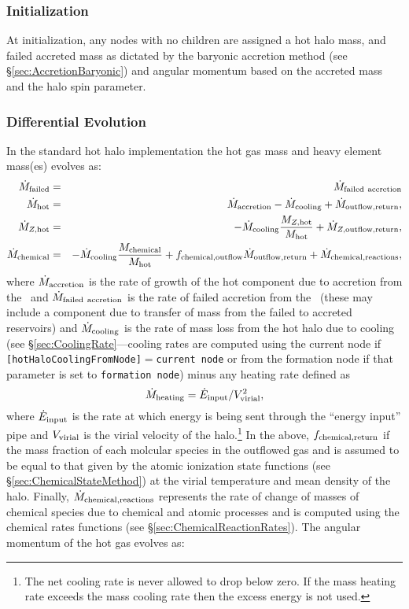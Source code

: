 \subsubsection{Initialization}

At initialization, any nodes with no children are assigned a hot halo mass, and failed accreted mass as dictated by the baryonic accretion method (see \S\ref{sec:AccretionBaryonic}) and angular momentum based on the accreted mass and the halo spin parameter.

\subsubsection{Differential Evolution}

In the standard hot halo implementation the hot gas mass and heavy element mass(es) evolves as:
\begin{eqnarray}
 \dot{M}_{\rm failed} &=& \dot{M}_{\rm failed~accretion} \\
 \dot{M}_{\rm hot} &=& \dot{M}_{\rm accretion} - \dot{M}_{\rm cooling} + \dot{M}_{\rm outflow,return}, \\
 \dot{M}_{Z, {\rm hot}} &=& - \dot{M}_{\rm cooling} {M_{Z, {\rm hot}}\over M_{\rm hot}} + \dot{M}_{Z, {\rm outflow,return}}, \\
 \dot{M}_{\rm chemical} &=& - \dot{M}_{\rm cooling} {M_{\rm chemical}\over M_{\rm hot}} + f_{\rm chemical,outflow} \dot{M}_{\rm outflow,return} + \dot{M}_{\rm chemical,reactions} , \\
\end{eqnarray}
where $\dot{M}_{\rm accretion}$ is the rate of growth of the hot component due to accretion from the \IGM\ and $\dot{M}_{\rm failed~accretion}$ is the rate of failed accretion from the \IGM\ (these may include a component due to transfer of mass from the failed to accreted reservoirs) and $\dot{M}_{\rm cooling}$ is the rate of mass loss from the hot halo due to cooling (see \S\ref{sec:CoolingRate}---cooling rates are computed using the current node if {\tt [hotHaloCoolingFromNode]}$=${\tt current node} or from the formation node if that parameter is set to {\tt formation node}) minus any heating rate defined as
\begin{equation}
 \dot{M}_{\rm heating} = \dot{E}_{\rm input} / V_{\rm virial}^2,
\end{equation}
where $\dot{E}_{\rm input}$ is the rate at which energy is being sent through the ``energy input'' pipe and $V_{\rm virial}$ is the virial velocity of the halo.\footnote{The net cooling rate is never allowed to drop below zero. If the mass heating rate exceeds the mass cooling rate then the excess energy is not used.} In the above, $f_{\rm chemical,return}$ if the mass fraction of each molcular species in the outflowed gas and is assumed to be equal to that given by the atomic ionization state functions (see \S\ref{sec:ChemicalStateMethod}) at the virial temperature and mean density of the halo. Finally, $\dot{M}_{\rm chemical,reactions}$ represents the rate of change of masses of chemical species due to chemical and atomic processes and is computed using the chemical rates functions (see \S\ref{sec:ChemicalReactionRates}). The angular momentum of the hot gas evolves as:
